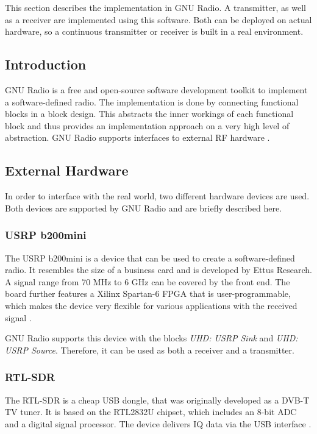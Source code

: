 This section describes the implementation in GNU Radio.
A transmitter, as well as a receiver are implemented using this software.
Both can be deployed on actual hardware, so a continuous transmitter or receiver is built in a real environment.

\subsection{Introduction}

GNU Radio is a free and open-source software development toolkit to implement a software-defined radio.
The implementation is done by connecting functional blocks in a block design.
This abstracts the inner workings of each functional block and thus provides an implementation approach on a very high level of abstraction.
GNU Radio supports interfaces to external RF hardware \cite{SoftwareGnuRadio}.

\subsection{External Hardware}

In order to interface with the real world, two different hardware devices are used.
Both devices are supported by GNU Radio and are briefly described here.

\subsubsection{USRP b200mini}

The USRP b200mini is a device that can be used to create a software-defined radio.
It resembles the size of a business card and is developed by Ettus Research.
A signal range from 70 MHz to 6 GHz can be covered by the front end.
The board further features a Xilinx Spartan-6 FPGA that is user-programmable, which makes the device very flexible for various applications with the received signal \cite{USRPb200Mini}.

GNU Radio supports this device with the blocks \textit{UHD: USRP Sink} and \textit{UHD: USRP Source}.
Therefore, it can be used as both a receiver and a transmitter.

\subsubsection{RTL-SDR}

The RTL-SDR is a cheap USB dongle, that was originally developed as a DVB-T TV tuner.
It is based on the RTL2832U chipset, which includes an 8-bit ADC and a digital signal processor.
The device delivers IQ data via the USB interface \cite{RTLSDR}.

